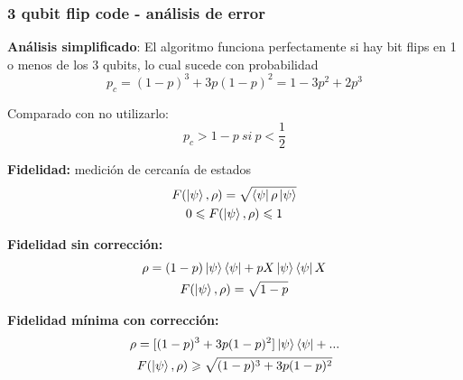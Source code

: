\documentclass[10pt]{beamer}
\theoremstyle{remark}
\theoremstyle{definition}
\begin{document}
\begin{frame}[allowframebreaks]


    \frametitle{3 qubit flip code - análisis de error}

    \textbf{Análisis simplificado}: El algoritmo funciona perfectamente si hay bit flips en 1 o menos de los 3 qubits, lo cual sucede con probabilidad
    \[
        p_c = (1 - p)^3 + 3p(1 - p)^2 = 1 - 3p^2 + 2p^3
    \]

    Comparado con no utilizarlo:
    \[
        p_c > 1 - p \ si \ p < \frac{1}{2}
    \]

    \framebreak

    \textbf{Fidelidad:} medición de cercanía de estados
    \begin{gather*}
        F(\ket{\psi}, \rho) = \sqrt{\bra{\psi} \rho \ket{\psi}} \\
        0 \leqslant F(\ket{\psi}, \rho) \leqslant 1
    \end{gather*}

    \textbf{Fidelidad sin corrección:}
    \begin{gather*}
        \rho = (1 - p) \ket{\psi}\bra{\psi} + p X \ket{\psi}\bra{\psi} X \\
        F(\ket{\psi}, \rho) = \sqrt{1 - p}
    \end{gather*}
    
    \textbf{Fidelidad mínima con corrección:}
    \begin{gather*}
        \rho = [(1 - p)^3 + 3p(1 - p)^2] \ket{\psi}\bra{\psi} + ... \\
        F(\ket{\psi}, \rho) \geqslant \sqrt{(1 - p)^3 + 3p(1 - p)^2}
    \end{gather*}

\end{frame}
\end{document}
